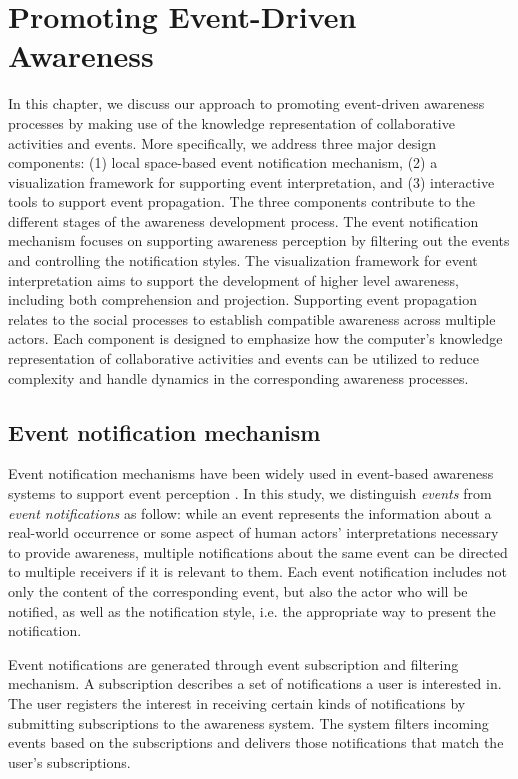 \graphicspath{{Figures/}}

\chapter{Promoting Event-Driven Awareness} %
\label{cha:promoting_event_driven_awareness}
In this chapter, we discuss our approach to promoting event-driven awareness processes by making use of the knowledge representation of collaborative activities and events. More specifically, we address three major design components: (1) local space-based event notification mechanism, (2) a visualization framework for supporting event interpretation, and (3) interactive tools to support event propagation. The three components contribute to the different stages of the awareness development process. The event notification mechanism focuses on supporting awareness perception by filtering out the events and controlling the notification styles. The visualization framework for event interpretation aims to support the development of higher level awareness, including both comprehension and projection. Supporting event propagation relates to the social processes to establish compatible awareness across multiple actors. Each component is designed to emphasize how the computer's knowledge representation of collaborative activities and events can be utilized to reduce complexity and handle dynamics in the corresponding awareness processes.

\section{Event notification mechanism} %
\label{sec:event_notification_mechanism}
Event notification mechanisms have been widely used in event-based awareness systems to support event perception \cite{McCrickard2003}. In this study, we distinguish \emph{events} from \emph{event notifications} as follow: while an event represents the information about a real-world occurrence or some aspect of human actors' interpretations necessary to provide awareness, multiple notifications about the same event can be directed to multiple receivers if it is relevant to them. Each event notification includes not only the content of the corresponding event, but also the actor who will be notified, as well as the notification style, i.e. the appropriate way to present the notification.

Event notifications are generated through event subscription and filtering mechanism. A subscription describes a set of notifications a user is interested in. The user registers the interest in receiving certain kinds of notifications by submitting subscriptions to the awareness system. The system filters incoming events based on the subscriptions and delivers those notifications that match the user's subscriptions. 

